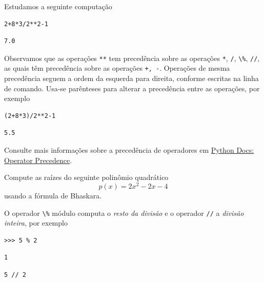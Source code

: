 \documentclass[12pt]{article}
\begin{document}
\begin{ex}
  Estudamos a seguinte computação

\begin{lstlisting}
2+8*3/2**2-1
\end{lstlisting}

\begin{verbatim}
7.0
\end{verbatim}

Observamos que as operações \lstinline+**+ tem precedência sobre as operações \lstinline+*+, \lstinline+/+, \lstinline+\%+, \lstinline+//+, as quais têm precedência sobre as operações \lstinline!+, -!. Operações de mesma precedência seguem a ordem da esquerda para direita, conforme escritas na linha de comando. Usa-se parênteses para alterar a precedência entre as operações, por exemplo

\begin{lstlisting}
(2+8*3)/2**2-1
\end{lstlisting}

\begin{verbatim}
5.5
\end{verbatim}

\end{ex}

\begin{obs}
Consulte mais informações sobre a precedência de operadores em \href{https://docs.python.org/3/reference/expressions.html#operator-precedence}{Python Docs: Operator Precedence}.
\end{obs}

\begin{exr}\label{exr:bhaskara}
  Compute as raízes do seguinte polinômio quadrático
  \begin{equation}
    p(x) = 2x^2 - 2x - 4
  \end{equation}
  usando a fórmula de Bhaskara{\bhaskara}.
\end{exr}

O operador \lstinline+\%+ módulo computa o \emph{resto da divisão} e o operador \lstinline+//+ a \emph{divisão inteira}, por exemplo

\begin{lstlisting}
>>> 5 % 2
\end{lstlisting}

\begin{verbatim}
1
\end{verbatim}

\begin{lstlisting}
5 // 2
\end{lstlisting}
\end{document}
